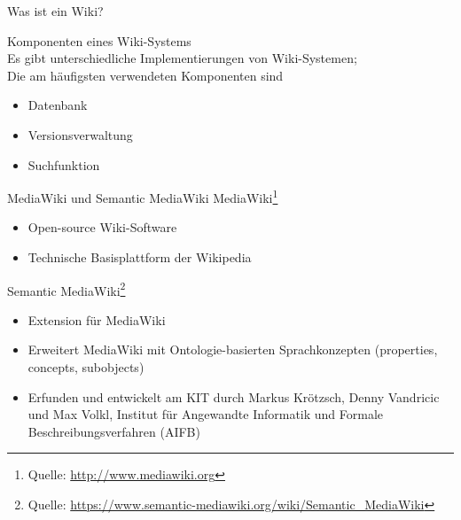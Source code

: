 \documentclass[aspectratio=1610,onlymath]{beamer}
\begin{document}
\begin{frame}{Was ist ein Wiki?}
	
	
	\vspace{2em}
	\alert{Komponenten eines Wiki-Systems}\\[1em]
	Es gibt unterschiedliche Implementierungen von Wiki-Systemen; \\
	Die am häufigsten verwendeten Komponenten sind
	\begin{itemize}
		\item Datenbank
		\item Versionsverwaltung
		\item Suchfunktion
	\end{itemize}

\end{frame}


\begin{frame}{MediaWiki und Semantic MediaWiki}
	\alert{MediaWiki}\footnote{Quelle: \url{http://www.mediawiki.org}}
	\begin{itemize}
		\item Open-source Wiki-Software
		\item Technische Basisplattform der Wikipedia
	\end{itemize}
	\bigskip
	
	\alert{Semantic MediaWiki}\footnote{Quelle: \url{https://www.semantic-mediawiki.org/wiki/Semantic_MediaWiki}}
	\begin{itemize}
		\item Extension für MediaWiki
		\item Erweitert MediaWiki mit Ontologie-basierten Sprachkonzepten (\alert{properties}, \alert{concepts}, \alert{subobjects})
		\item Erfunden und entwickelt am KIT durch Markus Krötzsch, Denny Vandricic und Max Volkl, Institut für Angewandte Informatik und Formale Beschreibungsverfahren (AIFB)
	\end{itemize}
	
\end{frame}
\end{document}
